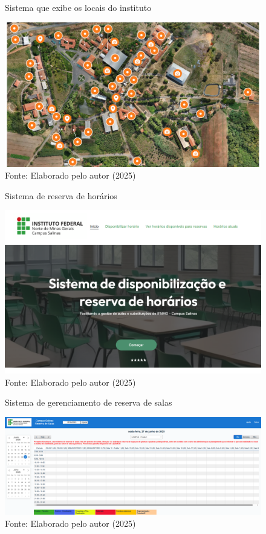 \begin{figure}[htb]
    \centering
    \caption{Sistema que exibe os locais do instituto}
    \includegraphics[width=1\textwidth]{Figuras/front-11.png}
    \caption*{Fonte: Elaborado pelo autor (2025)}
    \label{fig_front_11}
\end{figure}

\begin{figure}[H]
    \centering
    \caption{Sistema de reserva de horários}
    \includegraphics[width=1\textwidth]{Figuras/front-12.png}
    \caption*{Fonte: Elaborado pelo autor (2025)}
    \label{fig_front_12}
\end{figure}

\begin{figure}[htb]
    \centering
    \caption{Sistema de gerenciamento de reserva de salas}
    \includegraphics[width=1\textwidth]{Figuras/front-13.png}
    \caption*{Fonte: Elaborado pelo autor (2025)}
    \label{fig_front_13}
\end{figure}

